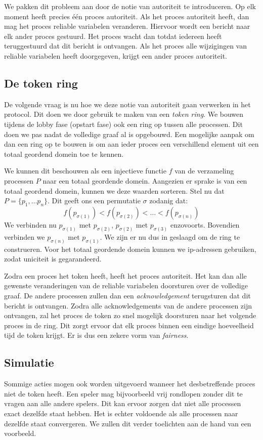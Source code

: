 \documentclass[a4paper,11pt]{article}
\begin{document}
    We pakken dit probleem aan door de notie van autoriteit te introduceren. Op elk moment heeft precies \'e\'en proces autoriteit. Als het proces autoriteit heeft, dan mag het proces reliable variabelen veranderen. Hiervoor wordt een bericht naar elk ander proces gestuurd. Het proces wacht dan totdat iedereen heeft teruggestuurd dat dit bericht is ontvangen. Als het proces alle wijzigingen van reliable variabelen heeft doorgegeven, krijgt een ander proces autoriteit.

    \subsection{De token ring}
    De volgende vraag is nu hoe we deze notie van autoriteit gaan verwerken in het protocol. Dit doen we door gebruik te maken van een \emph{token ring}. We bouwen tijdens de lobby fase (opstart fase) ook een ring op tussen alle processen. Dit doen we pas nadat de volledige graaf al is opgebouwd. Een mogelijke aanpak om dan een ring op te bouwen is om aan ieder proces een verschillend element uit een totaal geordend domein toe te kennen.

    We kunnen dit beschouwen als een injectieve functie $f$ van de verzameling processen $P$ naar een totaal geordende domein. Aangezien er sprake is van een totaal geordend domein, kunnen we deze waarden sorteren. Stel nu dat $P = \{ p_1, \ldots p_n\}$. Dit geeft ons een permutatie $\sigma$ zodanig dat:
    \[
    f(p_{\sigma(1)}) < f(p_{\sigma(2)}) < \ldots < f(p_{\sigma(n)})
    \]
    We verbinden nu $p_{\sigma(1)}$ met $p_{\sigma(2)}$, $p_{\sigma(2)}$ met $p_{\sigma(3)}$ enzovoorts. Bovendien verbinden we $p_{\sigma(n)}$ met $p_{\sigma(1)}$. We zijn er nu dus in geslaagd om de ring te construeren. Voor het totaal geordende domein kunnen we ip-adressen gebruiken, zodat uniciteit is gegarandeerd.

    Zodra een proces het token heeft, heeft het proces autoriteit. Het kan dan alle gewenste veranderingen van de reliable variabelen doorsturen over de volledige graaf. De andere processen zullen dan een \emph{acknowledgement} terugsturen dat dit bericht is ontvangen. Zodra alle acknowledgements van de andere processen zijn ontvangen, zal het proces de token zo snel mogelijk doorsturen naar het volgende proces in de ring. Dit zorgt ervoor dat elk proces binnen een eindige hoeveelheid tijd de token krijgt. Er is dus een zekere vorm van \emph{fairness}.

    \subsection{Simulatie}
    Sommige acties mogen ook worden uitgevoerd wanneer het desbetreffende proces niet de token heeft. Een speler mag bijvoorbeeld vrij rondlopen zonder dit te vragen aan alle andere spelers. Dit kan ervoor zorgen dat niet alle processen exact dezelfde staat hebben. Het is echter voldoende als alle processen naar dezelfde staat convergeren. We zullen dit verder toelichten aan de hand van een voorbeeld.
\end{document}
